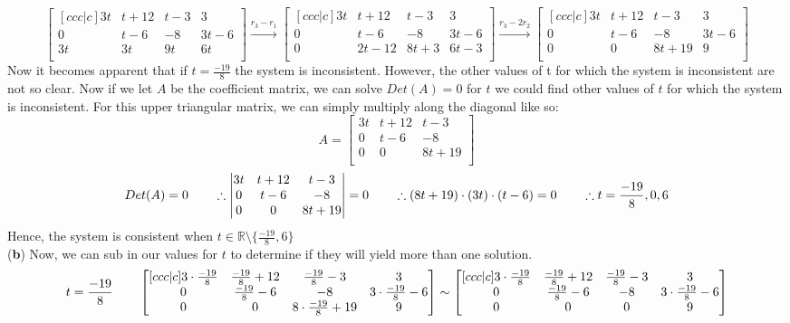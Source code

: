 \documentclass[12pt]{article}
\begin{document}
$$\begin{bmatrix}[ccc|c]
   3t & t+12 & t-3 & 3 \\
   0 & t-6 & -8 & 3t-6 \\
   3t & 3t & 9t & 6t \\
\end{bmatrix} \overset{r_3-r_1}{\longrightarrow} 
\begin{bmatrix}[ccc|c]
   3t & t+12 & t-3 & 3 \\
   0 & t-6 & -8 & 3t-6 \\
   0 & 2t-12 & 8t+3 & 6t-3 \\
\end{bmatrix} \overset{r_3-2r_2}{\longrightarrow} 
\begin{bmatrix}[ccc|c]
   3t & t+12 & t-3 & 3 \\
   0 & t-6 & -8 & 3t-6 \\
   0 & 0 & 8t+19 & 9 \\
\end{bmatrix}
$$
Now it becomes apparent that if $t=\frac{-19}{8}$ the system is inconsistent. However, the other values of t for which the system is inconsistent are not so clear. Now if we let $A$ be the coefficient matrix, we can solve $Det(A)=0$ for $t$ we could find other values of $t$ for which the system is inconsistent. For this upper triangular matrix, we can simply multiply along the diagonal like so:
$$
A = 
\begin{bmatrix}
   3t & t+12 & t-3 \\
   0 & t-6 & -8  \\
   0 & 0 & 8t+19 \\
\end{bmatrix}
$$
$$
Det(A)=0 \hspace{20px}
\therefore
\begin{vmatrix}
   3t & t+12 & t-3\\
   0 & t-6 & -8\\
   0 & 0 & 8t+19\\
\end{vmatrix} = 0
\hspace*{20pt}
\therefore(8t+19)\cdot(3t)\cdot(t-6)=0 
\hspace*{20pt}
\therefore t=\frac{-19}{8}, 0, 6
$$
Hence, the system is consistent when $t \in \mathbb{R} \setminus \{\frac{-19}{8},6\}$ \\
\medskip
(\textbf{b}) Now, we can sub in our values for $t$ to determine if they will yield more than one solution.
$$
t = \frac{-19}{8}
\hspace*{20pt}
\begin{bmatrix}[ccc|c]
   3\cdot\frac{-19}{8} & \frac{-19}{8}+12 & \frac{-19}{8}-3 & 3 \\
   0 & \frac{-19}{8}-6 & -8 & 3\cdot\frac{-19}{8}-6 \\
   0 & 0 & 8\cdot\frac{-19}{8}+19 & 9 \\
\end{bmatrix}  
\sim
\begin{bmatrix}[ccc|c]
   3\cdot\frac{-19}{8} & \frac{-19}{8}+12 & \frac{-19}{8}-3 & 3 \\
   0 & \frac{-19}{8}-6 & -8 & 3\cdot\frac{-19}{8}-6 \\
   0 & 0 & 0 & 9 \\
\end{bmatrix}
$$
\end{document}
